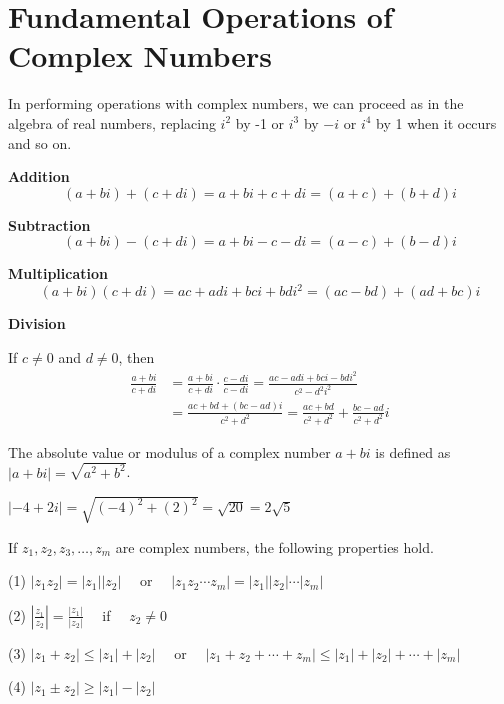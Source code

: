 \section{Fundamental Operations of Complex Numbers}
In performing operations with complex numbers, we can proceed as in the algebra of real numbers, replacing $i^2$ by -1 or $i^3$ by $-i$ or $i^4$ by 1 when it occurs and so on.
\begin{corollary}
    \textbf{Addition}
$$
(a+b i)+(c+d i)=a+b i+c+d i=(a+c)+(b+d) i
$$
\end{corollary}
\begin{corollary}
    \textbf{Subtraction}
$$
(a+b i)-(c+d i)=a+b i-c-d i=(a-c)+(b-d) i
$$
\end{corollary}
\begin{corollary}
    \textbf{Multiplication}
$$
(a+b i)(c+d i)=a c+a d i+b c i+b d i^2=(a c-b d)+(a d+b c) i
$$
\end{corollary}
\begin{corollary}
    \textbf{Division}\par 
\noindent If $c \neq 0$ and $d \neq 0$, then
$$
\begin{aligned}
\frac{a+b i}{c+d i} & =\frac{a+b i}{c+d i} \cdot \frac{c-d i}{c-d i}=\frac{a c-a d i+b c i-b d i^2}{c^2-d^2 i^2} \\
& =\frac{a c+b d+(b c-a d) i}{c^2+d^2}=\frac{a c+b d}{c^2+d^2}+\frac{b c-a d}{c^2+d^2} i
\end{aligned}
$$
\end{corollary}
\begin{defn}
    The absolute value or modulus of a complex number $a+b i$ is defined as $|a+b i|=\sqrt{a^2+b^2}$.
\end{defn}
\begin{ex}
    $|-4+2 i|=\sqrt{(-4)^2+(2)^2}=\sqrt{20}=2 \sqrt{5}$
\end{ex}
\begin{corollary}
    If $z_1, z_2, z_3, \ldots, z_m$ are complex numbers, the following properties hold.\par 
\noindent (1) $\displaystyle \left|z_1 z_2\right|=\left|z_1\right|\left|z_2\right| \quad$ or $\displaystyle\quad\left|z_1 z_2 \cdots z_m\right|=\left|z_1\right|\left|z_2\right| \cdots\left|z_m\right|$\par 
\noindent (2) $\displaystyle\left|\frac{z_1}{z_2}\right|=\frac{|z_1|}{|z_2|}\quad$ if $\displaystyle\quad z_2 \neq 0$\par 
\noindent (3) $\displaystyle\left|z_1+z_2\right| \leq\left|z_1\right|+\left|z_2\right| \quad$ or $\displaystyle\quad\left|z_1+z_2+\cdots+z_m\right| \leq\left|z_1\right|+\left|z_2\right|+\cdots+\left|z_m\right|$\par 
\noindent (4) $\displaystyle\left|z_1 \pm z_2\right| \geq\left|z_1\right|-\left|z_2\right|$
\end{corollary}
